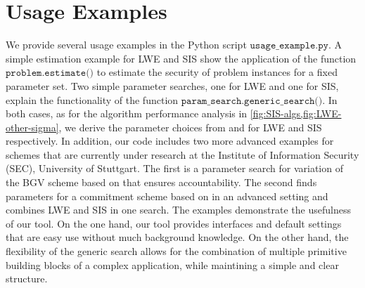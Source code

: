 \section{Usage Examples}\label{sec:tool-application}
We provide several usage examples in the Python script $\texttt{usage\_example.py}$. A simple estimation example for LWE and SIS show the application of the function $\texttt{problem.estimate()}$ to estimate the security of problem instances for a fixed parameter set. Two simple parameter searches, one for LWE and one for SIS, explain the functionality of the function $\texttt{param\_search.generic\_search()}$. In both cases, as for the algorithm performance analysis in \cref{fig:SIS-algs,fig:LWE-other-sigma}, we derive the parameter choices from \cite{Reg05} and \cite{MP12} for LWE and SIS respectively. %
In addition, our code includes two more advanced examples for schemes that are currently under research at the Institute of Information Security (SEC), University of Stuttgart. The first is a parameter search for variation of the BGV scheme based on \cite{BGV11,DPSZ12} that ensures accountability. The second finds parameters for a commitment scheme based on \cite{BDLOP18} in an advanced setting and combines LWE and SIS in one search. The examples demonstrate the usefulness of our tool. On the one hand, our tool provides interfaces and default settings that are easy use without much background knowledge. On the other hand, the flexibility of the generic search allows for the combination of multiple primitive building blocks of a complex application, while maintining a simple and clear structure.